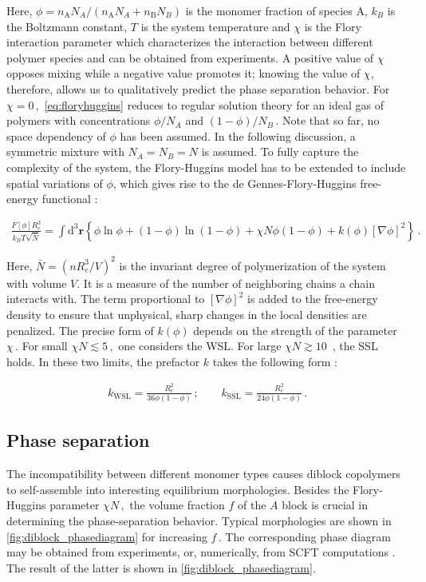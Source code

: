 \documentclass[bachelor,       %
               oneside,        %
               BCOR10mm,       %
               ngerman, english %
               ]{GAUBM}
\begin{document}
Here, $\phi=n_\mathrm AN_A/(n_\mathrm AN_A+n_\mathrm BN_B)$ is the monomer fraction of species A, $k_B$ is the Boltzmann constant, $T$ is the system temperature and $\chi$ is the Flory interaction parameter which characterizes the interaction between different polymer species and can be obtained from experiments. A positive value of $\chi$ opposes mixing while a negative value promotes it; knowing the value of $\chi$, therefore, allows us to qualitatively predict the phase separation behavior. For $\chi=0\,,$ \autoref{eq:floryhuggins} reduces to regular solution theory for an ideal gas of polymers with concentrations $\phi/N_A$ and $(1-\phi)/N_B\,.$  Note that so far, no space dependency of $\phi$ has been assumed. In the following discussion, a symmetric mixture with $N_A=N_B=N$ is assumed. To fully capture the complexity of the system, the Flory-Huggins model has to be extended to include spatial variations of $\phi$, which gives rise to the de Gennes-Flory-Huggins free-energy functional  \cite{deGennes80, Reister02}:


\begin{align}
  \frac{F[\phi]R_e^3}{k_BT\sqrt{\bar N}}=\int \mathrm{d}^3\mathbf{r}\left\{\phi\ln\phi+(1-\phi)\ln(1-\phi)+\chi N\phi(1-\phi)+k(\phi)[\nabla\phi]^2\right\}\,.
  \label{eq:flory_fctl}
\end{align}

Here, $\bar N=\left(nR_e^3/V\right)^2$ is the invariant degree of polymerization of the system with volume $V$. It is a measure of the number of neighboring chains a chain interacts with. The term proportional to $[\nabla\phi]^2$ is added to the free-energy density to ensure that unphysical, sharp changes in the local densities are penalized. The precise form of $k(\phi)$ depends on the strength of the parameter $\chi\,$. For small $\chi N\lesssim 5\,,$ one considers the \ac{WSL}. For large $\chi N\gtrsim10\,$ \cite{Semenov1996Dec}, the \ac{SSL} holds. In these two limits, the prefactor $k$ takes the following form \cite{Reister02}:

\begin{align}
  k_\mathrm{WSL}=\frac{R_e^2}{36\phi(1-\phi)}\,;\qquad k_\mathrm{SSL}=\frac{R_e^2}{24\phi(1-\phi)}\,.
\end{align}

\subsection{Phase separation}

The incompatibility between different monomer types causes diblock copolymers to self-assemble into interesting equilibrium morphologies. Besides the Flory-Huggins parameter $\chi N\,,$ the volume fraction $f$ of the $A$ block is crucial in determining the phase-separation behavior. Typical morphologies are shown in \autoref{fig:diblock_phasediagram} for increasing $f\,.$ The corresponding phase diagram may be obtained from experiments, or, numerically, from \ac{SCFT} computations \cite{matsen_copolymer}. The result of the latter is shown in \autoref{fig:diblock_phasediagram}.
\end{document}
